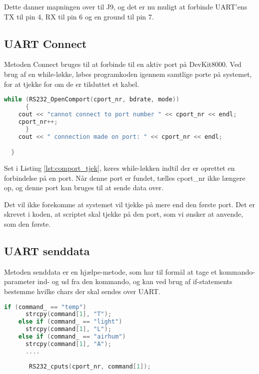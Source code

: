 Dette danner mapningen over til J9, og det er nu muligt at forbinde UART'ens TX til pin 4, RX til pin 6 og en ground til pin 7.

\subsection{UART Connect} 

Metoden Connect bruges til at forbinde til en aktiv port på DevKit8000. Ved brug af en while-løkke, løbes programkoden igennem samtlige porte på systemet, for at tjekke for om de er tilsluttet et kabel.

\begin{lstlisting}[language=C ,caption=connect metodens funktionalitet, label=lst:comport_tjek]
    while (RS232_OpenComport(cport_nr, bdrate, mode))
      {
	cout << "cannot connect to port number " << cport_nr << endl;
	cport_nr++;
      }
    cout << " connection made on port: " << cport_nr << endl;

  }
\end{lstlisting}

Set i Listing \ref{lst:comport_tjek}, køres while-løkken indtil der er oprettet en forbindelse på en port. Når denne port er fundet, tælles cport\_nr ikke længere op, og denne port kan bruges til at sende data over.

Det vil ikke forekomme at systemet vil tjekke på mere end den første port. Det er skrevet i koden, at scriptet skal tjekke på den port, som vi ønsker at anvende, som den første.

\subsection{UART senddata}

Metoden senddata er en hjælpe-metode, som har til formål at tage et kommando-parameter ind- og ud fra den kommando, og kan ved brug af if-statements bestemme hvilke chars der skal sendes over UART.

\begin{lstlisting}[language=C ,caption=logikken for at sende data ud på uartens tx, label=lst:UART_senddata]
    if (command_ == "temp")
      strcpy(command[1], "T");
    else if (command_ == "light")
      strcpy(command[1], "L");
    else if (command_ == "airhum")
      strcpy(command[1], "A");
      ....
      
       RS232_cputs(cport_nr, command[1]);
\end{lstlisting}

